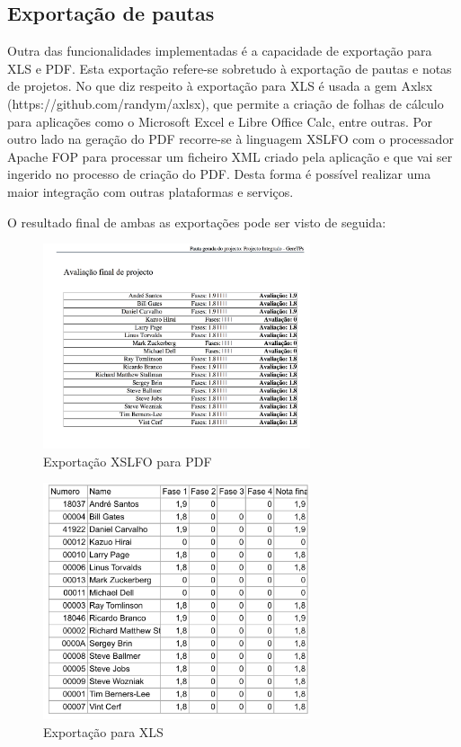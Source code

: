 \subsection{Exportação de pautas}

Outra das funcionalidades implementadas é a capacidade de exportação para XLS e PDF. 
Esta exportação refere-se sobretudo à exportação de pautas e notas de projetos. No que diz respeito à 
exportação para XLS é usada a gem Axlsx (https://github.com/randym/axlsx), que permite a criação de 
folhas de cálculo para aplicações como o Microsoft Excel e Libre Office Calc, entre outras.
Por outro lado na geração do PDF recorre-se à linguagem XSLFO com o processador 
Apache FOP para processar um ficheiro XML criado pela aplicação e que vai ser 
ingerido no processo de criação do PDF.
Desta forma é possível realizar uma maior integração com outras plataformas e 
serviços.

O resultado final de ambas as exportações pode ser visto de seguida:

\begin{figure}[H]
  \centering
  \includegraphics[width=0.7\textwidth,center]{images/implementacao/pauta1}
  \caption{Exportação XSLFO para PDF}
  \label{fig:pauta1}
\end{figure}

\begin{figure}[H]
  \centering
  \includegraphics[width=0.7\textwidth,center]{images/implementacao/pauta2}
  \caption{Exportação para XLS}
  \label{fig:pauta2}
\end{figure}